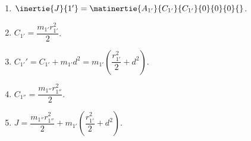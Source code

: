 \begin{enumerate}
\item $\inertie{J}{1'}=\matinertie{A_{1'}}{C_{1'}}{C_{1'}}{0}{0}{0}{}$.
\item $C_{1'}=\dfrac{m_{1'}r_{1'}^2}{2}$.
\item $C_{1'}'=C_{1'}+m_{1'}d^2=m_{1'}\left(\dfrac{r_{1'}^2}{2}+d^2\right)$.
\item $C_{1''}=\dfrac{m_{1''}r_{1''}^2}{2}$.
\item $J=\dfrac{m_{1''}r_{1''}^2}{2}+m_{1'}\left(\dfrac{r_{1'}^2}{2}+d^2\right)$.
\end{enumerate}

